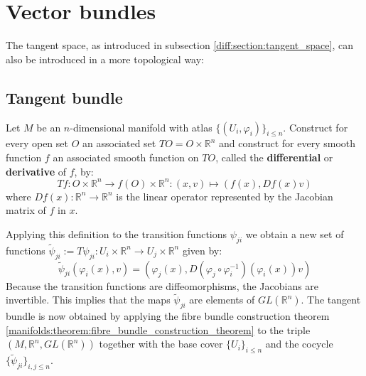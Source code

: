 \chapter{Vector bundles}\label{diff:chapter:vector_bundles}
	The tangent space, as introduced in subsection \ref{diff:section:tangent_space}, can also be introduced in a more topological way:
	
\section{Tangent bundle}

	\begin{construct}
		Let $M$ be an $n$-dimensional manifold with atlas $\{(U_i, \varphi_i)\}_{i\leq n}$. Construct for every open set $O$ an associated set $TO = O\times\mathbb{R}^n$ and construct for every smooth function $f$ an associated smooth function on $TO$, called the \textbf{differential} or \textbf{derivative} of $f$, by:
		\begin{equation}
			\label{diff:manifolds:T_function}
			Tf:O\times\mathbb{R}^n\rightarrow f(O)\times\mathbb{R}^n:(x, v)\mapsto(f(x), Df(x)v)
		\end{equation}
		where $Df(x):\mathbb{R}^n\rightarrow\mathbb{R}^n$ is the linear operator represented by the Jacobian matrix of $f$ in $x$.
		
		Applying this definition to the transition functions $\psi_{ji}$ we obtain a new set of functions $\widetilde{\psi}_{ji} := T\psi_{ji}:U_i\times\mathbb{R}^n\rightarrow U_j\times\mathbb{R}^n$ given by:
		\begin{equation}
			\widetilde{\psi}_{ji}(\varphi_i(x), v) = \left(\varphi_j(x), D(\varphi_j\circ\varphi_i^{-1})(\varphi_i(x))v\right)
		\end{equation}
		Because the transition functions are diffeomorphisms, the Jacobians are invertible. This implies that the maps $\widetilde\psi_{ji}$ are elements of $GL(\mathbb{R}^n)$. The tangent bundle is now obtained by applying the fibre bundle construction theorem \ref{manifolds:theorem:fibre_bundle_construction_theorem} to the triple $(M, \mathbb{R}^n, GL(\mathbb{R}^n))$ together with the base cover $\{U_i\}_{i\leq n}$ and the cocycle $\{\widetilde\psi_{ji}\}_{i,j\leq n}$.
	\end{construct}
